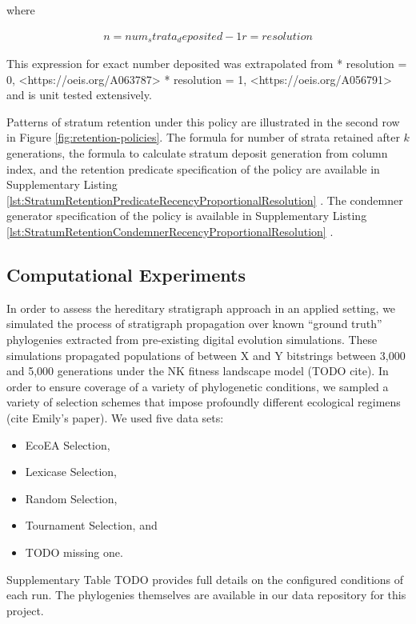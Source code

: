 where

\begin{align*}
  n = num_strata_deposited - 1
  r = resolution
\end{align*}

This expression for exact number deposited was extrapolated from
    * resolution = 0, <https://oeis.org/A063787> \citep{sloane2021a063787}
    * resolution = 1, <https://oeis.org/A056791> \citep{sloane2021a056791}
and is unit tested extensively.

Patterns of stratum retention under this policy are illustrated in the second row in Figure \ref{fig:retention-policies}.
The formula for number of strata retained after $k$ generations, the formula to calculate stratum deposit generation from column index, and the retention predicate specification of the policy are available in Supplementary Listing \ref{lst:StratumRetentionPredicateRecencyProportionalResolution} \citep{moreno2022hstratconceptsupplement}.
The condemner generator specification of the policy is available in Supplementary Listing \ref{lst:StratumRetentionCondemnerRecencyProportionalResolution} \citep{moreno2022hstratconceptsupplement}.


\subsection{Computational Experiments}

In order to assess the hereditary stratigraph approach in an applied setting, we simulated the process of stratigraph propagation over known ``ground truth'' phylogenies extracted from pre-existing digital evolution simulations.
These simulations propagated populations of between X and Y bitstrings between 3,000 and 5,000 generations under the NK fitness landscape model (TODO cite).
In order to ensure coverage of a variety of phylogenetic conditions, we sampled a variety of selection schemes that impose profoundly different ecological regimens (cite Emily's paper).
We used five data sets:
\begin{itemize}
  \item EcoEA Selection,
  \item Lexicase Selection,
  \item Random Selection,
  \item Tournament Selection, and
  \item TODO missing one.
\end{itemize}

Supplementary Table TODO provides full details on the configured conditions of each run.
The phylogenies themselves are available in our data repository for this project.


